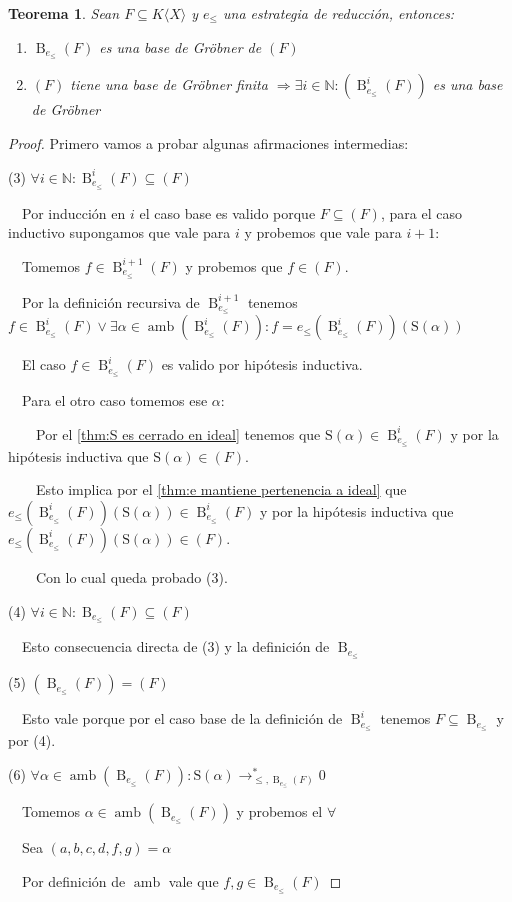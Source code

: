 \documentclass[fleqn]{amsbook} %
\theoremstyle{customstyle}
\newtheorem{theorem}{Teorema}[section]
\DeclareMathOperator{\amb}{amb}
\renewcommand{\S}{\text{S}}
\DeclareMathOperator{\B}{B}
\begin{document}
\begin{theorem}
Sean $F ⊆ K⟨X⟩$ y $e_≤$ una estrategia de reducción, entonces:
\begin{enumerate}
\item $\B_{e_≤}(F)$ es una base de Gröbner de $(F)$
\item $(F)$ tiene una base de Gröbner finita $⇒ ∃i ∈ ℕ : (\B_{e_≤}^i(F))$ es una base de Gröbner
\end{enumerate}
\end{theorem}
\begin{proof}
Primero vamos a probar algunas afirmaciones intermedias:

(3) $∀i ∈ ℕ : \B_{e_≤}^{i}(F) ⊆ (F)$

  Por inducción en $i$ el caso base es valido porque $F ⊆ (F)$, para el caso inductivo supongamos que vale para $i$ y probemos que vale para $i + 1$:

  Tomemos $f ∈ \B_{e_≤}^{i + 1}(F)$ y probemos que $f ∈ (F)$.

  Por la definición recursiva de $\B_{e_≤}^{i + 1}$ tenemos $f ∈ \B_{e_≤}^i(F) ∨ ∃α ∈ \amb(\B_{e_≤}^i(F)) : f = e_≤(\B_{e_≤}^i(F))(\S(α))$

  El caso $f ∈ \B_{e_≤}^i(F)$ es valido por hipótesis inductiva.

  Para el otro caso tomemos ese $α$:

    Por el \cref{thm:S es cerrado en ideal} tenemos que $\S(α) ∈ \B_{e_≤}^i(F)$ y por la hipótesis inductiva que $\S(α) ∈ (F)$.

    Esto implica por el \cref{thm:e mantiene pertenencia a ideal} que $e_≤(\B_{e_≤}^i(F))(\S(α)) ∈ \B_{e_≤}^i(F)$ y por la hipótesis inductiva que $e_≤(\B_{e_≤}^i(F))(\S(α)) ∈ (F)$.

    Con lo cual queda probado (3).

(4) $∀i ∈ ℕ : \B_{e_≤}(F) ⊆ (F)$

  Esto consecuencia directa de (3) y la definición de $\B_{e_≤}$

(5) $(\B_{e_≤}(F)) = (F)$

  Esto vale porque por el caso base de la definición de $\B_{e_≤}^i$ tenemos $F ⊆ \B_{e_≤}$ y por (4).

(6) $∀α ∈ \amb(\B_{e_≤}(F)) : \S(α) →^*_{≤, \B_{e_≤}(F)} 0$

  Tomemos $α ∈ \amb(\B_{e_≤}(F))$ y probemos el $∀$

  Sea $(a, b, c, d, f, g) = α$

  Por definición de $\amb$ vale que $f, g ∈ \B_{e_≤}(F)$


\end{proof}
\end{document}
